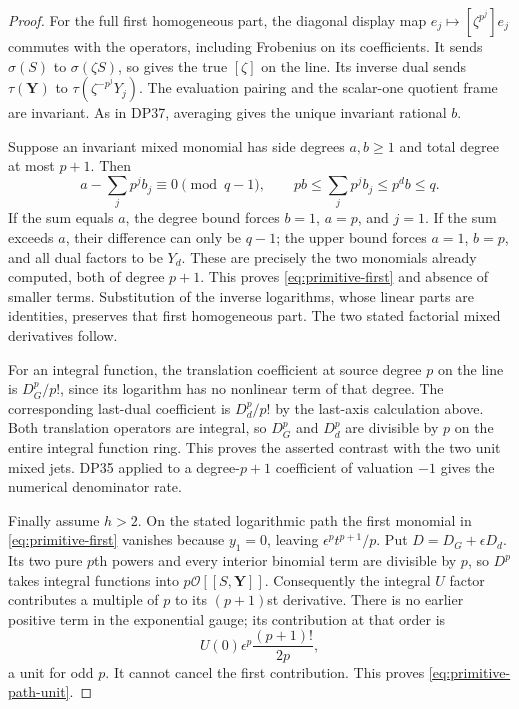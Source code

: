 \documentclass[11pt,a4paper]{article}
\theoremstyle{definition}\newtheorem{remark}[theorem]{Remark}
\begin{document}
\begin{proof}
For the full first homogeneous part, the diagonal display map $e_j\mapsto[\zeta^{p^j}]e_j$ commutes with the operators, including Frobenius on its coefficients. It sends $\sigma(S)$ to $\sigma(\zeta S)$, so gives the true $[\zeta]$ on the line. Its inverse dual sends $\tau(\mathbf Y)$ to $\tau(\zeta^{-p^j}Y_j)$. The evaluation pairing and the scalar-one quotient frame are invariant. As in DP37, averaging gives the unique invariant rational $b$.

Suppose an invariant mixed monomial has side degrees $a,b\ge1$ and total degree at most $p+1$. Then
\[
 a-\sum_jp^jb_j\equiv0\pmod{q-1},\qquad
 pb\le\sum_jp^jb_j\le p^db\le q.
\]
If the sum equals $a$, the degree bound forces $b=1$, $a=p$, and $j=1$. If the sum exceeds $a$, their difference can only be $q-1$; the upper bound forces $a=1$, $b=p$, and all dual factors to be $Y_d$. These are precisely the two monomials already computed, both of degree $p+1$. This proves \eqref{eq:primitive-first} and absence of smaller terms. Substitution of the inverse logarithms, whose linear parts are identities, preserves that first homogeneous part. The two stated factorial mixed derivatives follow.

For an integral function, the translation coefficient at source degree $p$ on the line is $D_G^p/p!$, since its logarithm has no nonlinear term of that degree. The corresponding last-dual coefficient is $D_d^p/p!$ by the last-axis calculation above. Both translation operators are integral, so $D_G^p$ and $D_d^p$ are divisible by $p$ on the entire integral function ring. This proves the asserted contrast with the two unit mixed jets. DP35 applied to a degree-$p+1$ coefficient of valuation $-1$ gives the numerical denominator rate.

Finally assume $h>2$. On the stated logarithmic path the first monomial in \eqref{eq:primitive-first} vanishes because $y_1=0$, leaving $\epsilon^pt^{p+1}/p$. Put $D=D_G+\epsilon D_d$. Its two pure $p$th powers and every interior binomial term are divisible by $p$, so $D^p$ takes integral functions into $p\mathcal O[[S,\mathbf Y]]$. Consequently the integral $U$ factor contributes a multiple of $p$ to its $(p+1)$st derivative. There is no earlier positive term in the exponential gauge; its contribution at that order is
\[
 U(0)\epsilon^p\frac{(p+1)!}{2p},
\]
a unit for odd $p$. It cannot cancel the first contribution. This proves \eqref{eq:primitive-path-unit}.
\end{proof}
\end{document}
